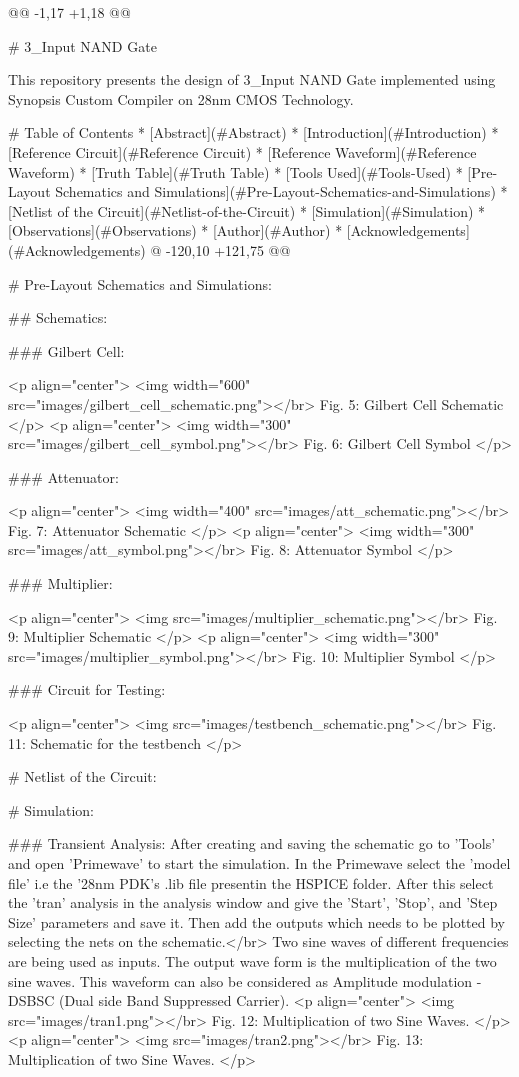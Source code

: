 @@ -1,17 +1,18 @@

# 3_Input NAND Gate

This repository presents the design of 3_Input NAND Gate implemented using Synopsis Custom Compiler on 28nm CMOS Technology.

# Table of Contents
 * [Abstract](#Abstract)
 * [Introduction](#Introduction)
 * [Reference Circuit](#Reference Circuit)
 * [Reference Waveform](#Reference Waveform)
 * [Truth Table](#Truth Table)
 * [Tools Used](#Tools-Used)
 * [Pre-Layout Schematics and Simulations](#Pre-Layout-Schematics-and-Simulations)
 * [Netlist of the Circuit](#Netlist-of-the-Circuit)
 * [Simulation](#Simulation)
 * [Observations](#Observations)
 * [Author](#Author)
 * [Acknowledgements](#Acknowledgements)
@ -120,10 +121,75 @@ 

# Pre-Layout Schematics and Simulations:

## Schematics:

### Gilbert Cell:

<p align="center">
  <img width="600" src="images/gilbert_cell_schematic.png"></br>
  Fig. 5: Gilbert Cell Schematic
</p>
<p align="center">
  <img width="300" src="images/gilbert_cell_symbol.png"></br>
  Fig. 6: Gilbert Cell Symbol
</p>

### Attenuator:

<p align="center">
  <img width="400" src="images/att_schematic.png"></br>
  Fig. 7: Attenuator Schematic
</p>
<p align="center">
  <img width="300" src="images/att_symbol.png"></br>
  Fig. 8: Attenuator Symbol
</p>

### Multiplier:

<p align="center">
  <img src="images/multiplier_schematic.png"></br>
  Fig. 9: Multiplier Schematic
</p>
<p align="center">
  <img width="300" src="images/multiplier_symbol.png"></br>
  Fig. 10: Multiplier Symbol
</p>

### Circuit for Testing:

<p align="center">
  <img src="images/testbench_schematic.png"></br>
  Fig. 11: Schematic for the testbench
</p>

# Netlist of the Circuit:

# Simulation:

### Transient Analysis:
After creating and saving the schematic go to 'Tools' and open 'Primewave' to start the simulation. In the Primewave select the 'model file' i.e the '28nm PDK's .lib file presentin the HSPICE folder. After this select the 'tran' analysis in the analysis window and give the 'Start', 'Stop', and 'Step Size' parameters and save it. Then add the outputs which needs to be plotted by selecting the nets on the schematic.</br>
Two sine waves of different frequencies are being used as inputs. The output wave form is the multiplication of the two sine waves. This waveform can also be considered as Amplitude modulation - DSBSC (Dual side Band Suppressed Carrier).
<p align="center">
  <img src="images/tran1.png"></br>
  Fig. 12: Multiplication of two Sine Waves.
</p>
<p align="center">
  <img src="images/tran2.png"></br>
  Fig. 13: Multiplication of two Sine Waves.
</p>


